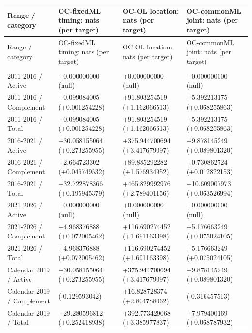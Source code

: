 \begingroup\small\setlength{\tabcolsep}{2pt}\renewcommand{\arraystretch}{1.18}
\begin{longtable}{@{}>{\raggedright\arraybackslash}p{}>{\raggedright\arraybackslash}p{}>{\raggedright\arraybackslash}p{}>{\raggedright\arraybackslash}p{}@{}}
\toprule
{}Range / category & OC-fixedML timing: nats (per target) & OC-OL location: nats (per target) & OC-commonML joint: nats (per target) \\
\midrule\endfirsthead
\toprule
Range / category & OC-fixedML timing: nats (per target) & OC-OL location: nats (per target) & OC-commonML joint: nats (per target) \\
\midrule\endhead
\midrule\multicolumn{4}{r}{\emph{Continued on next page}}\\
\endfoot
\bottomrule\endlastfoot
{}2011-2016 / Active & +0.000000000 (null) & +0.000000000 (null) & +0.000000000 (null) \\
{}2011-2016 / Complement & +0.099084005 (+0.001254228) & +91.803254519 (+1.162066513) & +5.392213175 (+0.068255863) \\
{}2011-2016 / Total & +0.099084005 (+0.001254228) & +91.803254519 (+1.162066513) & +5.392213175 (+0.068255863) \\
{}2016-2021 / Active & +30.058155064 (+0.273255955) & +375.944700694 (+3.417679097) & +9.878145249 (+0.089801320) \\
{}2016-2021 / Complement & +2.664723302 (+0.046749532) & +89.885292282 (+1.576934952) & +0.730862724 (+0.012822153) \\
{}2016-2021 / Total & +32.722878366 (+0.195945379) & +465.829992976 (+2.789401156) & +10.609007973 (+0.063526994) \\
{}2021-2026 / Active & +0.000000000 (null) & +0.000000000 (null) & +0.000000000 (null) \\
{}2021-2026 / Complement & +4.968376888 (+0.072005462) & +116.690274452 (+1.691163398) & +5.176663249 (+0.075024105) \\
{}2021-2026 / Total & +4.968376888 (+0.072005462) & +116.690274452 (+1.691163398) & +5.176663249 (+0.075024105) \\
{}Calendar 2019 / Active & +30.058155064 (+0.273255955) & +375.944700694 (+3.417679097) & +9.878145249 (+0.089801320) \\
{}Calendar 2019 / Complement & -0.777558252 (-0.129593042) & +16.828728374 (+2.804788062) & -1.898745079 (-0.316457513) \\
{}Calendar 2019 / Total & +29.280596812 (+0.252418938) & +392.773429068 (+3.385977837) & +7.979400169 (+0.068787932) \\

\end{longtable}
